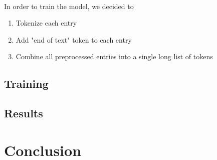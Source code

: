 \documentclass[12pt]{article}
\begin{document}
\paragraph{}
In order to train the model, we decided to
\begin{enumerate}
	\item Tokenize each entry
	\item Add "end of text" token to each entry
	\item Combine all preprocessed entries into a single long list of tokens
\end{enumerate}

\subsection{Training}



\subsection{Results}

\section{Conclusion}
\end{document}
